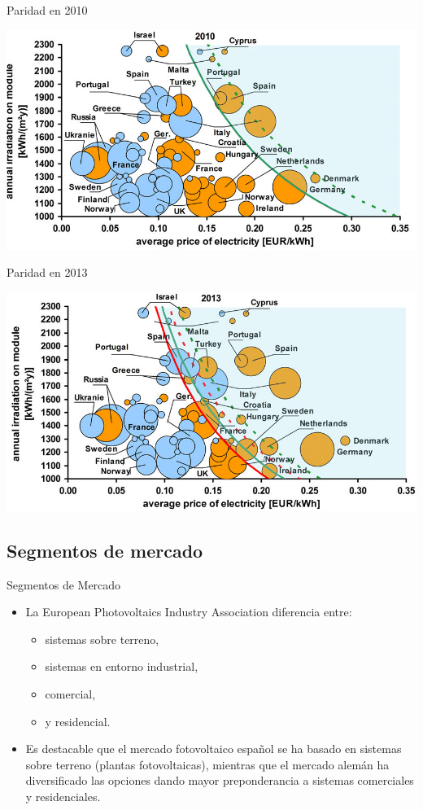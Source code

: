 \documentclass[xcolor={usenames,svgnames,dvipsnames}]{beamer}
\begin{document}
\begin{frame}[label={sec:orga15f6cb}]{Paridad en 2010}
\begin{center}
\includegraphics[width=.9\linewidth]{../figs/GridParity2010.png}
\end{center}
\end{frame}

\begin{frame}[label={sec:org6a4d931}]{Paridad en 2013}
\begin{center}
\includegraphics[width=.9\linewidth]{../figs/GridParity2013.png}
\end{center}
\end{frame}

\subsection{Segmentos de mercado}
\label{sec:org4f6e2f0}

\begin{frame}[label={sec:orgbd54e7c}]{Segmentos de Mercado}
\begin{itemize}
\item La European Photovoltaics Industry Association diferencia entre:
\begin{itemize}
\item sistemas sobre terreno,
\item sistemas en entorno industrial,
\item comercial,
\item y residencial.
\end{itemize}
\item Es destacable que el mercado fotovoltaico español se ha basado en
sistemas sobre terreno (plantas fotovoltaicas), mientras que el
mercado alemán ha diversificado las opciones dando mayor
preponderancia a sistemas comerciales y residenciales.
\end{itemize}
\end{frame}
\end{document}

